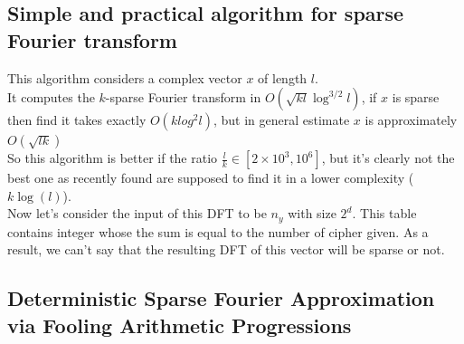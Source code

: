 \documentclass{article}
\begin{document}
\subsection{Simple and practical algorithm for sparse Fourier transform}
This algorithm considers a complex vector $x$ of length $l$.\\
It computes the $k$-sparse Fourier transform in $O(\sqrt{kl}\log^{3/2}l)$, if $x$ is sparse then find it takes exactly $O(klog^{2}l)$, but in general estimate $x$ is approximately $O(\sqrt{lk})$\\
So this algorithm is better if the ratio $\frac{l}{k} \in [2 \times 10^3, 10^6]$, but it's clearly not the best one as recently found are supposed to find it in a lower complexity ($k\log(l)$).\\
Now let's consider the input of this DFT to be $n_y$ with size $2^d$. This table contains integer whose the sum is equal to the number of cipher given. As a result, we can't say that the resulting DFT of this vector will be sparse or not.

\subsection{Deterministic Sparse Fourier Approximation via Fooling Arithmetic Progressions}
\end{document}
